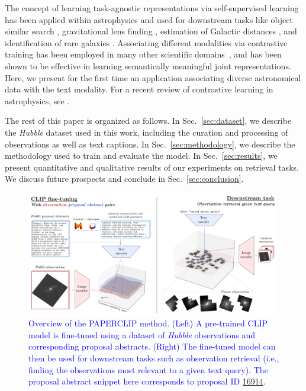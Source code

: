 \documentclass[10pt]{article} %
\newcommand{\hubble}{\emph{Hubble}\xspace}
\newcommand{\changes}[1]{\textcolor{blue}{#1}}
\begin{document}
%
The concept of learning task-agnostic representations via self-supervised learning has been applied within astrophysics \cite{slijepcevic2024radio,stein2021self,hayat2021self,slijepcevic2022learning} and used for downstream tasks like object similar search \citep{stein2021self}, gravitational lens finding \citep{stein2022mining}, estimation of Galactic distances \citep{hayat2021estimating}, and identification of rare galaxies \citep{walmsley2023rare}.
%
Associating different modalities via contrastive training has been employed in many other scientific domains~\citep[e.g.,][]{liu2023text,Sanchez-Fernandez2022.11.17.516915,lanusse2023astroclip,cepeda2023geoclip}, and has been shown to be effective in learning semantically meaningful joint representations. Here, we present for the first time an application associating diverse astronomical data with the text modality.
%
For a recent review of contrastive learning in astrophysics, see \citet{huertas2023brief}. 
%

The rest of this paper is organized as follows.
%
In Sec.~\ref{sec:dataset}, we describe the \hubble dataset used in this work, including the curation and processing of observations as well as text captions.
%
In Sec.~\ref{sec:methodology}, we describe the methodology used to train and evaluate the model.
%
In Sec.~\ref{sec:results}, we present quantitative and qualitative results of our experiments on retrieval tasks.
%
We discuss future prospects and conclude in Sec.~\ref{sec:conclusion}.

\begin{figure}[!t]
\centering
\includegraphics[width=0.99\textwidth]{plots/figure.pdf}
\caption{\changes{Overview of the PAPERCLIP method. (Left) A pre-trained CLIP model is fine-tuned using a dataset of \hubble observations and corresponding proposal abstracts. (Right) The fine-tuned model can then be used for downstream tasks such as observation retrieval (i.e., finding the observations most relevant to a given text query). The proposal abstract snippet here corresponds to proposal ID \href{https://archive.stsci.edu/proposal_search.php?id=16914&mission=hst}{16914}}.}
\label{fig:overview}
\end{figure}
\end{document}
